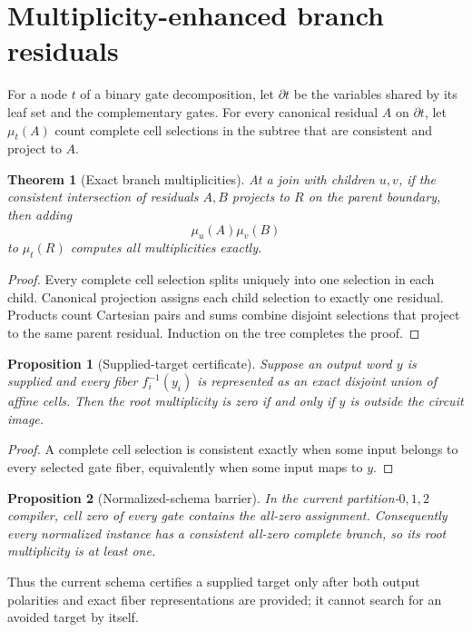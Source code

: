 \documentclass[11pt]{article}
\newtheorem{theorem}{Theorem}
\newtheorem{proposition}{Proposition}
\begin{document}
\section{Multiplicity-enhanced branch residuals}

For a node $t$ of a binary gate decomposition, let $\partial t$ be the
variables shared by its leaf set and the complementary gates.  For every
canonical residual $A$ on $\partial t$, let $\mu_t(A)$ count complete cell
selections in the subtree that are consistent and project to $A$.

\begin{theorem}[Exact branch multiplicities]
At a join with children $u,v$, if the consistent intersection of residuals
$A,B$ projects to $R$ on the parent boundary, then adding
\[
  \mu_u(A)\mu_v(B)
\]
to $\mu_t(R)$ computes all multiplicities exactly.
\end{theorem}

\begin{proof}
Every complete cell selection splits uniquely into one selection in each
child.  Canonical projection assigns each child selection to exactly one
residual.  Products count Cartesian pairs and sums combine disjoint selections
that project to the same parent residual.  Induction on the tree completes the
proof.
\end{proof}

\begin{proposition}[Supplied-target certificate]
Suppose an output word $y$ is supplied and every fiber $f_i^{-1}(y_i)$ is
represented as an exact disjoint union of affine cells.  Then the root
multiplicity is zero if and only if $y$ is outside the circuit image.
\end{proposition}

\begin{proof}
A complete cell selection is consistent exactly when some input belongs to
every selected gate fiber, equivalently when some input maps to $y$.
\end{proof}

\begin{proposition}[Normalized-schema barrier]
In the current partition-$0,1,2$ compiler, cell zero of every gate contains the
all-zero assignment.  Consequently every normalized instance has a consistent
all-zero complete branch, so its root multiplicity is at least one.
\end{proposition}

Thus the current schema certifies a supplied target only after both output
polarities and exact fiber representations are provided; it cannot search for
an avoided target by itself.
\end{document}
